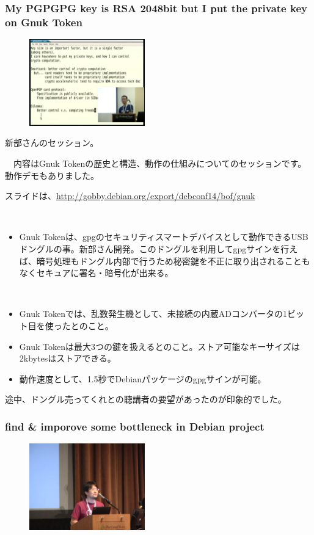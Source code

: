 \documentclass[mingoth,a4paper]{jsarticle}
\begin{document}
\subsubsection{My PGPGPG key is RSA 2048bit but I put the private key on Gnuk Token}

\begin{figure}
  \includegraphics[width=5cm]{image201409/gnuk.png}
\end{figure}

 新部さんのセッション。

　内容はGnuk Tokenの歴史と構造、動作の仕組みについてのセッションです。動作デモもありました。

 スライドは、\url{http://gobby.debian.org/export/debconf14/bof/gnuk}

　\begin{itemize}
  \item Gnuk Tokenは、gpgのセキュリティスマートデバイスとして動作できるUSBドングルの事。新部さん開発。このドングルを利用してgpgサインを行えば、暗号処理もドングル内部で行うため秘密鍵を不正に取り出されることもなくセキュアに署名・暗号化が出来る。　　　　
　\end{itemize}

　\begin{itemize}
  \item Gnuk Tokenでは、乱数発生機として、未接続の内蔵ADコンバータの1ビット目を使ったとのこと。
  \item Gnuk Tokenは最大3つの鍵を扱えるとのこと。ストア可能なキーサイズは2kbytesはストアできる。
　\item 動作速度として、1.5秒でDebianパッケージのgpgサインが可能。
  \end{itemize}

 途中、ドングル売ってくれとの聴講者の要望があったのが印象的でした。

\subsubsection{find \& imporove some bottleneck in Debian project}

\begin{figure}
  \includegraphics[width=5cm]{image201409/find_improve.png}
\end{figure}
\end{document}
